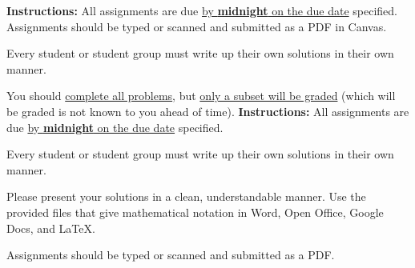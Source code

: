 
\extrawidth{0.5in} \extrafootheight{-0in} \pagestyle{headandfoot}
\headrule {} \footrule {}
\ifprintanswers
\noindent \textbf{Instructions:} All assignments are due \underline{by
\textbf{midnight} on the due date} specified.  Assignments should be typed or
scanned and submitted as a PDF in Canvas.

\medskip
\noindent Every student or student group must write up their own solutions in
their own manner.

\medskip
\noindent You should \underline{complete all problems}, but \underline{only a
subset will be graded} (which will be graded is not known to you ahead of
time).
\else
\noindent \textbf{Instructions:} All assignments are due \underline{by \textbf{midnight} on the due date} specified.

\medskip
\noindent Every student or student group  must write up their own solutions in
their own manner.

\medskip
\noindent Please present your solutions in a clean, understandable
manner.  Use the provided files that give mathematical notation in Word, Open Office, Google Docs, and \LaTeX.

\medskip
\noindent Assignments should be typed or scanned and submitted as a PDF.

